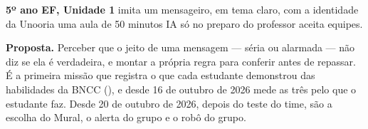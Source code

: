 

\textbf{5º ano EF, Unidade 1} \textperiodcentered{} imita um mensageiro, em
tema claro, com a identidade da Unooria \textperiodcentered{} uma aula de 50 minutos
\textperiodcentered{} IA só no preparo do professor \textperiodcentered{}
aceita equipes.

\textbf{Proposta.} Perceber que o jeito de uma mensagem --- séria ou alarmada
--- não diz se ela é verdadeira, e montar a própria regra para conferir antes
de repassar. É a primeira missão que registra o que cada estudante demonstrou
das habilidades da BNCC (), e desde 16 de outubro de 2026 mede as três
pelo que o estudante faz. Desde 20 de outubro de 2026, depois do teste do
time, são a escolha do Mural, o alerta do grupo e o robô do grupo.

